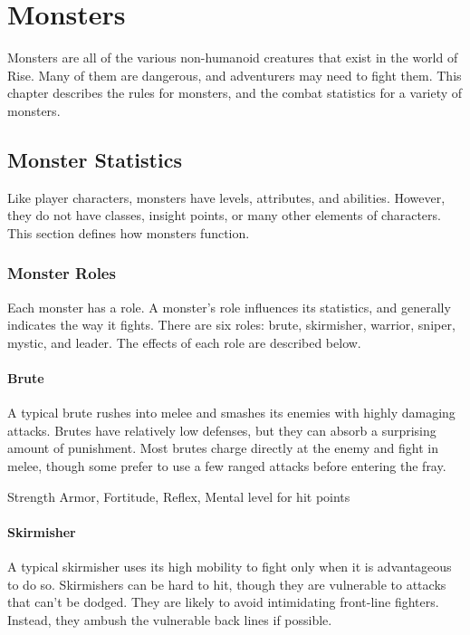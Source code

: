 \chapter{Monsters}

Monsters are all of the various non-humanoid creatures that exist in the world of Rise.
Many of them are dangerous, and adventurers may need to fight them.
This chapter describes the rules for monsters, and the combat statistics for a variety of monsters.

\section{Monster Statistics}
    Like player characters, monsters have levels, attributes, and abilities.
    However, they do not have classes, insight points, or many other elements of characters.
    This section defines how monsters function.

    \subsection{Monster Roles}
        Each monster has a role.
        A monster's role influences its statistics, and generally indicates the way it fights.
        There are six roles: brute, skirmisher, warrior, sniper, mystic, and leader.
        The effects of each role are described below.

        \subsubsection{Brute}
            A typical brute rushes into melee and smashes its enemies with highly damaging attacks.
            Brutes have relatively low defenses, but they can absorb a surprising amount of punishment.
            Most brutes charge directly at the enemy and fight in melee, though some prefer to use a few ranged attacks before entering the fray.

              Strength
              Armor,  Fortitude,  Reflex,  Mental
              level for hit points

        \subsubsection{Skirmisher}
            A typical skirmisher uses its high mobility to fight only when it is advantageous to do so.
            Skirmishers can be hard to hit, though they are vulnerable to attacks that can't be dodged.
            They are likely to avoid intimidating front-line fighters.
            Instead, they ambush the vulnerable back lines if possible.

